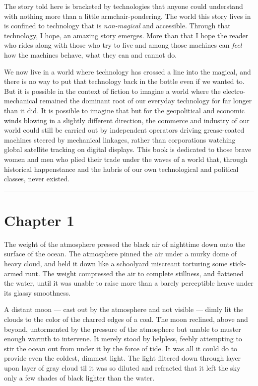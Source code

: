 \documentclass[]{scrbook}
\begin{document}
The story told here is bracketed by technologies that anyone could
understand with nothing more than a little armchair-pondering. The world
this story lives in is confined to technology that is \emph{non-magical}
and accessible. Through that technology, I hope, an amazing story
emerges. More than that I hope the reader who rides along with those who
try to live and among those machines can \emph{feel} how the machines
behave, what they can and cannot do.

We now live in a world where technology has crossed a line into the
magical, and there is no way to put that technology back in the bottle
even if we wanted to. But it is possible in the context of fiction to
imagine a world where the electro-mechanical remained the dominant root
of our everyday technology for far longer than it did. It is possible to
imagine that but for the geopolitical and economic winds blowing in a
slightly different direction, the commerce and industry of our world
could still be carried out by independent operators driving
grease-coated machines steered by mechanical linkages, rather than
corporations watching global satellite tracking on digital displays.
This book is dedicated to those brave women and men who plied their
trade under the waves of a world that, through historical happenstance
and the hubris of our own technological and political classes, never
existed.

\begin{center}\rule{0.5\linewidth}{\linethickness}\end{center}

\hypertarget{chapter-1}{%
\chapter*{Chapter 1}\label{chapter-1}}

The weight of the atmosphere pressed the black air of nighttime down
onto the surface of the ocean. The atmosphere pinned the air under a
murky dome of heavy cloud, and held it down like a schoolyard miscreant
torturing some stick-armed runt. The weight compressed the air to
complete stillness, and flattened the water, until it was unable to
raise more than a barely perceptible heave under its glassy smoothness.

A distant moon --- cast out by the atmosphere and not visible --- dimly
lit the clouds to the color of the charred edges of a coal. The moon
reclined, above and beyond, untormented by the pressure of the
atmosphere but unable to muster enough warmth to intervene. It merely
stood by helpless, feebly attempting to stir the ocean out from under it
by the force of tide. It was all it could do to provide even the
coldest, dimmest light. The light filtered down through layer upon layer
of gray cloud til it was so diluted and refracted that it left the sky
only a few shades of black lighter than the water.
\end{document}
